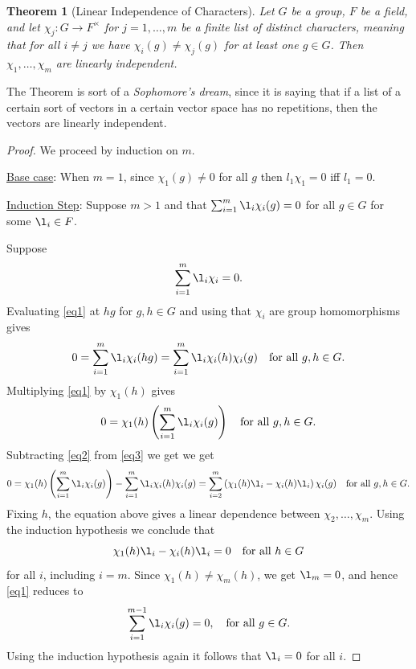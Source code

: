 \documentclass[12pt]{amsart}
\newtheorem{theorem}{Theorem}[section]
\theoremstyle{definition}
\numberwithin{equation}{theorem}
\def\to{\longrightarrow}
\begin{document}
\begin{theorem}[Linear Independence of Characters]\label{linear independence of characters}
Let $G$ be a group, $F$ be a field, and let $\chi_j: G \to F^{\times}$ for $j = 1, \dots, m$ be a finite list of distinct characters, meaning that for all $i \neq j$ we have $\chi_i(g) \neq \chi_j(g)$ for at least one $g \in G$. Then $\chi_1, \dots, \chi_m$ are linearly independent.
\end{theorem}

The Theorem is sort of a \emph{Sophomore's dream}, since it is saying that if a list of a certain sort of vectors in a certain vector space has no repetitions, then the vectors are linearly independent.


\begin{proof} 
We proceed by induction on $m$. 

\underline{Base case}: When $m=1$, since $\chi_1(g) \neq 0$ for all $g$ then $l_1\chi_1=0$ iff $l_1=0$.

\underline{Induction Step}:
Suppose $m > 1$ and that $\sum_{i=1}^m \l_i \chi_i(g) = 0$ for all $g \in G$ for some $\l_i \in F$.  
 
Suppose 
  \begin{equation}
  \label{eq1}
  \sum_{i=1}^m \l_i \chi_i=0.
  \end{equation}
  Evaluating \eqref{eq1} at $hg$ for $g,h\in G$ and using that $\chi_i$ are group homomorphisms gives
  \begin{equation}
  \label{eq2}
0 = \sum_{i=1}^m \l_i \chi_i(hg) = \sum_{i=1}^m \l_i \chi_i(h) \chi_i(g) \quad \textrm{for all } g,h\in G.
\end{equation}
Multiplying  \eqref{eq1}  by $\chi_1(h)$ gives
 \begin{equation}
  \label{eq3}
0 = \chi_1(h)\left(\sum_{i=1}^m \l_i \chi_i(g) \right) \quad \textrm{for all } g,h\in G.
\end{equation}
Subtracting \eqref{eq2} from \eqref{eq3} we get
we get
$$
0 =
 \chi_1(h)\left(\sum_{i=1}^m \l_i \chi_i(g) \right)
-
 \sum_{i=1}^m \l_i \chi_i(h) \chi_i(g)
 = \sum_{i=2}^{m} \left(\chi_1(h) \l_i - \chi_i(h) \l_i \right) \chi_i(g) \quad \textrm{for all } g,h\in G.
$$
Fixing $h$, the equation above gives a linear dependence between $\chi_2,\ldots, \chi_m$. Using the induction hypothesis we conclude that
$$\chi_{1}(h) \l_i - \chi_i(h) \l_i = 0 \quad \textrm{for all } h\in G$$
for all $i$, including $i = m$. Since $\chi_{1}(h) \ne \chi_m(h)$,
we get $\l_m = 0$, and hence \eqref{eq1} reduces to 
$$\sum_{i=1}^{m-1} \l_i \chi_i(g) = 0, \quad \textrm{for all } g\in G.$$
Using the induction hypothesis again it follows that $\l_i = 0$ for all $i$.
\end{proof}
\end{document}
